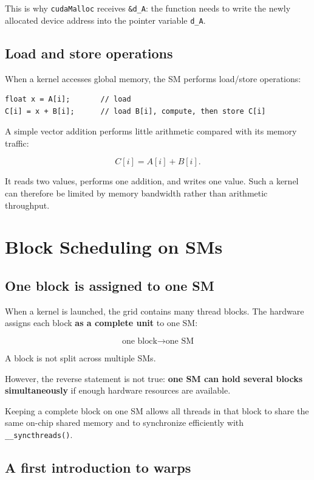 \documentclass[11pt,a4paper]{article}
\begin{document}
This is why \texttt{cudaMalloc} receives \texttt{\&d\_A}: the function needs to write the newly allocated device address into the pointer variable \texttt{d\_A}.

\subsection{Load and store operations}

When a kernel accesses global memory, the SM performs load/store operations:

\begin{lstlisting}
float x = A[i];       // load
C[i] = x + B[i];      // load B[i], compute, then store C[i]
\end{lstlisting}

A simple vector addition performs little arithmetic compared with its memory traffic:

\[
C[i] = A[i] + B[i].
\]

It reads two values, performs one addition, and writes one value. Such a kernel can therefore be limited by memory bandwidth rather than arithmetic throughput.

\section{Block Scheduling on SMs}

\subsection{One block is assigned to one SM}

When a kernel is launched, the grid contains many thread blocks. The hardware assigns each block \textbf{as a complete unit} to one SM:

\[
\boxed{
\text{one block}
\rightarrow
\text{one SM}
}
\]

A block is not split across multiple SMs.

However, the reverse statement is not true: \textbf{one SM can hold several blocks simultaneously} if enough hardware resources are available.

Keeping a complete block on one SM allows all threads in that block to share the same on-chip shared memory and to synchronize efficiently with \texttt{\_\_syncthreads()}.

\subsection{A first introduction to warps}
\end{document}
